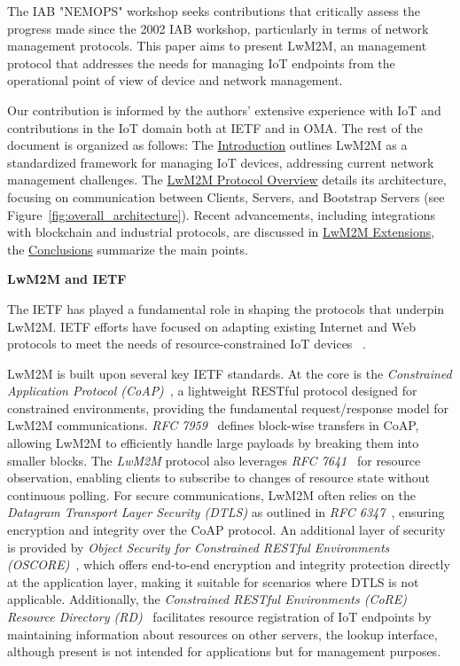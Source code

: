 \documentclass[11pt,sigconf]{iabart}
\begin{document}
The IAB "NEMOPS" workshop seeks contributions that critically assess the progress made since the 2002 IAB workshop, particularly in terms of network management protocols. This paper aims to present LwM2M, an management protocol that addresses the needs for managing IoT endpoints from the operational point of view of device and network management.

Our contribution is informed by the authors' extensive experience with IoT and contributions in the IoT domain both at IETF and in OMA. The rest of the document is organized as follows: The \hyperref[introduction]{Introduction} outlines LwM2M as a standardized framework for managing IoT devices, addressing current network management challenges. The \hyperref[overview]{LwM2M Protocol Overview} details its architecture, focusing on communication between Clients, Servers, and Bootstrap Servers (see Figure~\ref{fig:overall_architecture}). Recent advancements, including integrations with blockchain and industrial protocols, are discussed in \hyperref[extensions]{LwM2M Extensions}, the \hyperref[conclusions]{Conclusions} summarize the main points.

\textbf{LwM2M and IETF}

The IETF has played a fundamental role in shaping the protocols that underpin LwM2M. IETF efforts have focused on adapting existing Internet and Web protocols to meet the needs of resource-constrained IoT devices ~\cite{9139045}.

LwM2M is built upon several key IETF standards. At the core is the \textit{Constrained Application Protocol (CoAP)}~\cite{rfc7252}, a lightweight RESTful protocol designed for constrained environments, providing the fundamental request/response model for LwM2M communications. \textit{RFC 7959}~\cite{rfc7959} defines block-wise transfers in CoAP, allowing LwM2M to efficiently handle large payloads by breaking them into smaller blocks. The \textit{LwM2M} protocol also leverages \textit{RFC 7641}~\cite{rfc7641} for resource observation, enabling clients to subscribe to changes of resource state without continuous polling. For secure communications, LwM2M often relies on the \textit{Datagram Transport Layer Security (DTLS)} as outlined in \textit{RFC 6347}~\cite{rfc6347}, ensuring encryption and integrity over the CoAP protocol. An additional layer of security is provided by \textit{Object Security for Constrained RESTful Environments (OSCORE)}~\cite{rfc8613}, which offers end-to-end encryption and integrity protection directly at the application layer, making it suitable for scenarios where DTLS is not applicable. Additionally, the \textit{Constrained RESTful Environments (CoRE) Resource Directory (RD)}~\cite{rfc9176} facilitates resource registration of IoT endpoints by maintaining information about resources on other servers, the lookup interface, although present is not intended for applications but for management purposes.
\sloppy
\end{document}
